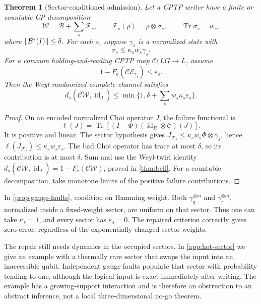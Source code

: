 \documentclass[11pt,reqno]{amsart}
\numberwithin{equation}{section}
\newtheorem{theorem}{Theorem}[section]
\theoremstyle{definition}
\theoremstyle{remark}
\newcommand{\Tr}{\operatorname{Tr}}
\newcommand{\id}{\operatorname{id}}
\newcommand{\Ecal}{\mathcal E}
\newcommand{\Wcal}{\mathcal W}
\newcommand{\Fe}{F_{\mathrm e}}
\newcommand{\diam}{d_\diamond}
\DeclarePairedDelimiter{\norm}{\lVert}{\rVert}
\begin{document}
\begin{theorem}[Sector-conditioned admission]\label{thm:sector}
Let a CPTP writer have a finite or countable CP decomposition
\[
          \Wcal=\mathcal B+\sum_s\mathcal F_s,\qquad
          \mathcal F_s(\rho)=\rho\otimes\sigma_s,
          \qquad \Tr\sigma_s=w_s,
\]
where \(\norm{\mathcal B^*(I)}\le\delta\).
For each \(s\), suppose \(\gamma_s\) is a normalized state with
\[
                    \sigma_s\le\kappa_s w_s\gamma_s.
\]
For a common holding-and-reading CPTP map \(\mathcal C:LG\to L\),
assume
\[
       1-\Fe(\mathcal C\Ecal_{\gamma_s})\le\varepsilon_s.
\]
Then the Weyl-randomized complete channel satisfies
\begin{equation}\label{eq:sector}
 \diam(\widetilde{\mathcal C\Wcal},\id_d)
       \le\min\{1,\delta+\sum_s w_s\kappa_s\varepsilon_s\}.
\end{equation}
\end{theorem}
\begin{proof}
On an encoded normalized Choi operator \(J\), the failure functional is
\[
          \ell(J)=\Tr[(I-\Phi)(\id_R\otimes\mathcal C)(J)].
\]
It is positive and linear. The sector hypothesis gives
\(J_{\mathcal F_s}\le\kappa_s w_s\Phi\otimes\gamma_s\), hence
\(\ell(J_{\mathcal F_s})\le\kappa_s w_s\varepsilon_s\).
The bad Choi operator has trace at most \(\delta\), so its contribution
is at most \(\delta\). Sum and use the Weyl-twirl identity
\(\diam(\widetilde{\mathcal C\Wcal},\id_d)
 =1-\Fe(\mathcal C\Wcal)\), proved in \cref{thm:bell}.
For a countable decomposition, take monotone limits of the positive
failure contributions.
\end{proof}

In \cref{prop:gauge-faults}, condition on Hamming weight. Both
\(\gamma_q^{\otimes m}\) and \(\gamma_r^{\otimes m}\), normalized
inside a fixed-weight sector, are uniform on that sector.
Thus one can take \(\kappa_s=1\), and every sector has
\(\varepsilon_s=0\). The repaired criterion correctly gives zero error,
regardless of the exponentially changed sector weights.

The repair still needs dynamics in the occupied sectors. In
\cref{app:hot-sector} we give an example with a thermally rare sector
that swaps the input into an inaccessible qubit. Independent gauge
faults populate that sector with probability tending to one, although
the logical input is exact immediately after writing.
The example has a growing-support interaction and is therefore an
obstruction to an abstract inference, not a local three-dimensional
no-go theorem.
\end{document}
